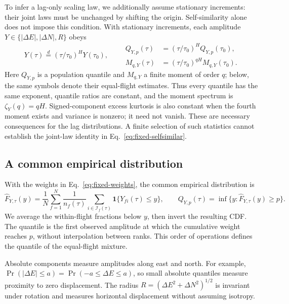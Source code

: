 To infer a lag-only scaling law, we additionally assume stationary increments:
their joint laws must be unchanged by shifting the origin.
Self-similarity alone does not impose this condition. With stationary increments,
each amplitude $Y\in\{|\Delta E|,|\Delta N|,R\}$ obeys
\begin{equation}
 Y(\tau)\overset d=(\tau/\tau_0)^H Y(\tau_0),\qquad
 \begin{aligned}
 Q_{Y,p}(\tau)&=(\tau/\tau_0)^H Q_{Y,p}(\tau_0),\\
 M_{q,Y}(\tau)&=(\tau/\tau_0)^{qH}M_{q,Y}(\tau_0).
 \end{aligned}
 \label{eq:fixed-scale-family}
\end{equation}
Here $Q_{Y,p}$ is a population quantile and $M_{q,Y}$ a finite moment of order $q$;
below, the same symbols denote their equal-flight estimates.
Thus every quantile has the same exponent, quantile ratios are constant, and the
moment spectrum is $\zeta_Y(q)=qH$. Signed-component excess kurtosis is also constant
when the fourth moment exists and variance is nonzero; it need not vanish. These are
necessary consequences for the lag distributions. A finite selection of such
statistics cannot establish the joint-law identity in Eq.~\eqref{eq:fixed-selfsimilar}.

\subsection{A common empirical distribution}

With the weights in Eq.~\eqref{eq:fixed-weights}, the common empirical distribution is
\begin{equation}
 \widehat F_{Y,\tau}(y)=\frac1N\sum_{f=1}^N\frac1{n_f(\tau)}
 \sum_{i\in\mathcal I_f(\tau)}\mathbf1\{Y_{fi}(\tau)\leq y\},\qquad
 Q_{Y,p}(\tau)=\inf\{y:\widehat F_{Y,\tau}(y)\geq p\}.
 \label{eq:fixed-cdf}
\end{equation}
We average the within-flight fractions below $y$, then invert the resulting CDF.
The quantile is the first observed amplitude at which the cumulative weight reaches
$p$, without interpolation between ranks. This order of operations defines the
quantile of the equal-flight mixture.

Absolute components measure amplitudes along east and north. For example,
$\Pr(|\Delta E|\leq a)=\Pr(-a\leq\Delta E\leq a)$, so small absolute quantiles
measure proximity to zero displacement. The radius $R=(\Delta E^2+\Delta N^2)^{1/2}$
is invariant under rotation and measures horizontal displacement without assuming
isotropy.

